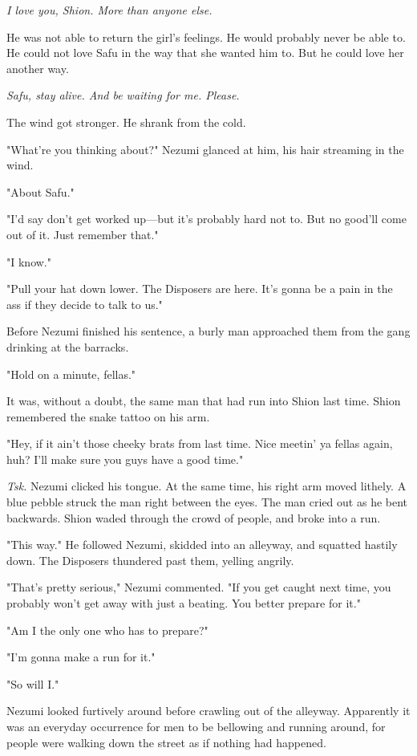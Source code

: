 \emph{I love you, Shion. More than anyone else.}

He was not able to return the girl's feelings. He would probably never
be able to. He could not love Safu in the way that she wanted him to.
But he could love her another way.

\emph{Safu, stay alive. And be waiting for me. Please.}

The wind got stronger. He shrank from the cold.

"What're you thinking about?" Nezumi glanced at him, his hair streaming
in the wind.

"About Safu."

"I'd say don't get worked up---but it's probably hard not to. But no
good'll come out of it. Just remember that."

"I know."

"Pull your hat down lower. The Disposers are here. It's gonna be a pain
in the ass if they decide to talk to us."

Before Nezumi finished his sentence, a burly man approached them from
the gang drinking at the barracks.

"Hold on a minute, fellas."

It was, without a doubt, the same man that had run into Shion last time.
Shion remembered the snake tattoo on his arm.

"Hey, if it ain't those cheeky brats from last time. Nice meetin' ya
fellas again, huh? I'll make sure you guys have a good time."

\emph{Tsk.} Nezumi clicked his tongue. At the same time, his right arm moved
lithely. A blue pebble struck the man right between the eyes. The man
cried out as he bent backwards. Shion waded through the crowd of people,
and broke into a run.

"This way." He followed Nezumi, skidded into an alleyway, and squatted
hastily down. The Disposers thundered past them, yelling angrily.

"That's pretty serious," Nezumi commented. "If you get caught next time,
you probably won't get away with just a beating. You better prepare for
it."

"Am I the only one who has to prepare?"

"I'm gonna make a run for it."

"So will I."

Nezumi looked furtively around before crawling out of the alleyway.
Apparently it was an everyday occurrence for men to be bellowing and
running around, for people were walking down the street as if nothing
had happened.

